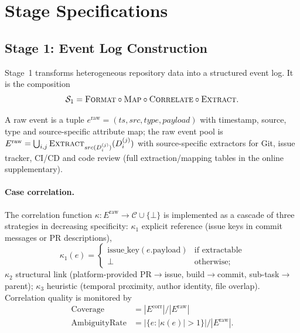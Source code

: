 
\section{Stage Specifications}
\label{sec:stages}

\subsection{Stage 1: Event Log Construction}
\label{sec:stages-s1}

Stage~1 transforms heterogeneous repository data into a structured event
log. It is the composition
\begin{equation}
\label{eq:s1-decomposition}
\mathcal{S}_1 = \textsc{Format} \circ \textsc{Map} \circ
    \textsc{Correlate} \circ \textsc{Extract}.
\end{equation}

A raw event is a tuple
$e^{\text{raw}} = (ts, src, type, payload)$ with timestamp, source,
type and source-specific attribute map; the raw event pool is
$E^{\text{raw}} = \bigcup_{i,j} \textsc{Extract}_{src(D_i^{(j)})}(D_i^{(j)})$
with source-specific extractors for Git, issue tracker, CI/CD and
code review (full extraction/mapping tables in the online
supplementary).

\paragraph{Case correlation.}
The correlation function
$\kappa : E^{\text{raw}} \to \mathcal{C} \cup \{\bot\}$ is implemented
as a cascade of three strategies in decreasing specificity:
$\kappa_1$ explicit reference (issue keys in commit messages or PR
descriptions),
\begin{equation}
\label{eq:kappa1}
\kappa_1(e) = \begin{cases}
    \text{issue\_key}(e.\text{payload}) & \text{if extractable} \\
    \bot & \text{otherwise};
\end{cases}
\end{equation}
$\kappa_2$ structural link (platform-provided PR$\to$issue,
build$\to$commit, sub-task$\to$parent);
$\kappa_3$ heuristic (temporal proximity, author identity, file
overlap). Correlation quality is monitored by
\begin{align}
\text{Coverage} &= |E^{\text{corr}}| / |E^{\text{raw}}|
    \label{eq:corr-coverage} \\
\text{AmbiguityRate} &= |\{e : |\kappa(e)| > 1\}| / |E^{\text{raw}}|
    \label{eq:corr-ambiguity}.
\end{align}

